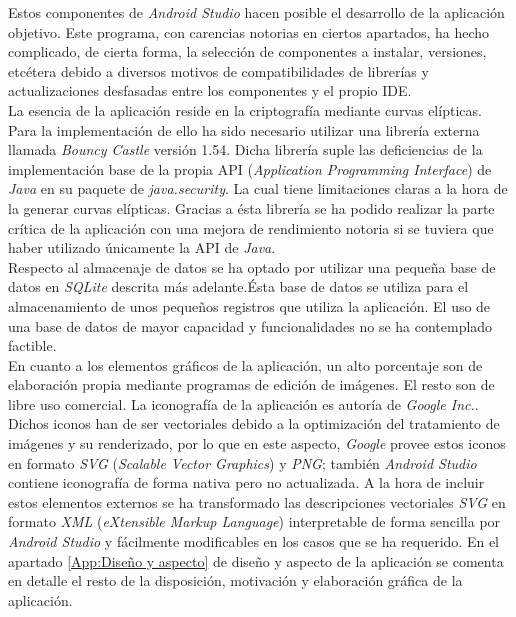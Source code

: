 \documentclass[../PFC.tex]{subfiles}
\begin{document}
Estos componentes de \textit{Android Studio} hacen posible el desarrollo de la aplicación objetivo. Este programa, con carencias notorias en ciertos apartados, ha hecho complicado, de cierta forma, la selección de componentes a instalar, versiones, etcétera debido a diversos motivos de compatibilidades de librerías y actualizaciones desfasadas entre los componentes y el propio IDE. 
\*
\vspace{0.5515cm}
\\
La esencia de la aplicación reside en la criptografía mediante curvas elípticas. Para la implementación de ello ha sido necesario utilizar una librería externa llamada \textit{Bouncy Castle}\cite{bouncyCastle} versión 1.54. Dicha librería suple las deficiencias de la implementación base de la propia API (\textit{Application Programming Interface}) de \textit{Java} en su paquete de \textit{java.security}\cite{javaSecurity}. La cual tiene limitaciones claras a la hora de la generar curvas elípticas. Gracias a ésta librería se ha podido realizar la parte crítica de la aplicación con una mejora de rendimiento notoria si se tuviera que haber utilizado únicamente la API de \textit{Java}. 
\*
\vspace{0.5515cm}
\\
Respecto al almacenaje de datos se ha optado por utilizar una pequeña base de datos en \textit{SQLite}\cite{sqlite} descrita más adelante.Ésta base de datos se utiliza para el almacenamiento de unos pequeños registros que utiliza la aplicación. El uso de una base de datos de mayor capacidad y funcionalidades no se ha contemplado factible. 
\*
\vspace{0.5515cm}
\\
En cuanto a los elementos gráficos de la aplicación, un alto porcentaje son de elaboración propia mediante programas de edición de imágenes. El resto son de libre uso comercial. La iconografía de la aplicación es autoría de \textit{Google Inc.}\cite{googleIcons}. Dichos iconos han de ser vectoriales debido a la optimización del tratamiento de imágenes y su renderizado, por lo que en este aspecto, \textit{Google} provee estos  iconos en formato \textit{SVG} (\textit{Scalable Vector Graphics}) y \textit{PNG}; también \textit{Android Studio} contiene iconografía de forma nativa pero no actualizada. A la hora de incluir estos elementos externos se ha transformado las descripciones vectoriales \textit{SVG} en formato \textit{XML} (\textit{eXtensible Markup Language}) interpretable de forma sencilla por \textit{Android Studio} y fácilmente modificables en los casos que se ha requerido. En el apartado \ref{App:Diseño y aspecto} de diseño y aspecto de la aplicación se comenta en detalle el resto de la disposición, motivación y elaboración gráfica de la aplicación. 
\end{document}
